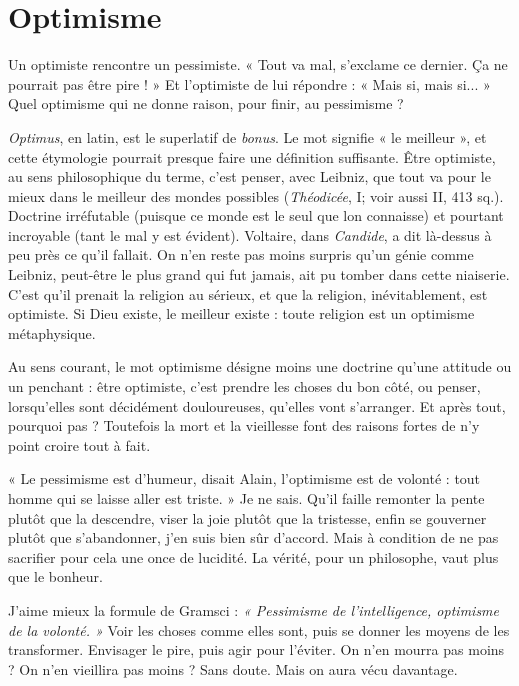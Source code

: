 \section{Optimisme}
Un optimiste rencontre un pessimiste. « Tout va mal, s’exclame
ce dernier. Ça ne pourrait pas être pire ! » Et l’optimiste
de lui répondre : « Mais si, mais si... » Quel optimisme qui ne donne raison,
pour finir, au pessimisme ?

{\it Optimus}, en latin, est le superlatif de {\it bonus}. Le mot signifie « le meilleur »,
et cette étymologie pourrait presque faire une définition suffisante. Être optimiste,
au sens philosophique du terme, c’est penser, avec Leibniz, que tout va
pour le mieux dans le meilleur des mondes possibles ({\it Théodicée}, I; voir aussi
II, 413 sq.). Doctrine irréfutable (puisque ce monde est le seul que lon
connaisse) et pourtant incroyable (tant le mal y est évident). Voltaire, dans
{\it Candide}, a dit là-dessus à peu près ce qu’il fallait. On n’en reste pas moins surpris
qu'un génie comme Leibniz, peut-être le plus grand qui fut jamais, ait pu
tomber dans cette niaiserie. C’est qu’il prenait la religion au sérieux, et que la
religion, inévitablement, est optimiste. Si Dieu existe, le meilleur existe : toute
religion est un optimisme métaphysique.

Au sens courant, le mot optimisme désigne moins une doctrine qu’une attitude
ou un penchant : être optimiste, c’est prendre les choses du bon côté, ou
penser, lorsqu’elles sont décidément douloureuses, qu’elles vont s'arranger. Et
après tout, pourquoi pas ? Toutefois la mort et la vieillesse font des raisons
fortes de n’y point croire tout à fait.

« Le pessimisme est d’humeur, disait Alain, l’optimisme est de volonté :
tout homme qui se laisse aller est triste. » Je ne sais. Qu'il faille remonter la
pente plutôt que la descendre, viser la joie plutôt que la tristesse, enfin se gouverner
plutôt que s’abandonner, j’en suis bien sûr d’accord. Mais à condition
de ne pas sacrifier pour cela une once de lucidité. La vérité, pour un philosophe,
vaut plus que le bonheur.

J'aime mieux la formule de Gramsci : {\it « Pessimisme de l'intelligence, optimisme
de la volonté. »} Voir les choses comme elles sont, puis se donner les
moyens de les transformer. Envisager le pire, puis agir pour l’éviter. On n’en
mourra pas moins ? On n’en vieillira pas moins ? Sans doute. Mais on aura
vécu davantage.

